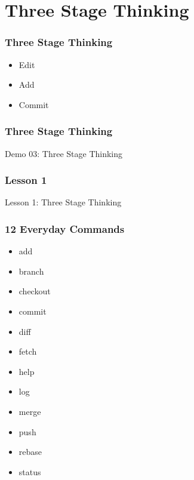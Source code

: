 \section[Section]{Three Stage Thinking}

\begin{frame}
\frametitle{Three Stage Thinking}
\begin{itemize}
    \setlength\itemsep{3em}
    \item Edit
    \item Add
    \item Commit
\end{itemize}
\end{frame}

\begin{frame}
\frametitle{Three Stage Thinking}
\alert{Demo 03}: Three Stage Thinking
\end{frame}

\begin{frame}
\frametitle{Lesson 1}
\alert{Lesson 1}: Three Stage Thinking
\end{frame}

\begin{frame}
\frametitle{12 Everyday Commands}
\begin{multicols}{3}
    \begin{itemize}
        \setlength\itemsep{3em}
        \item \alert{add}
        \item branch
        \item checkout
        \item \alert{commit}
        \item \alert{diff}
        \item fetch
        \item \alert{help}
        \item \alert{log}
        \item merge
        \item push
        \item rebase
        \item \alert{status}
    \end{itemize}
\end{multicols}
\end{frame}
